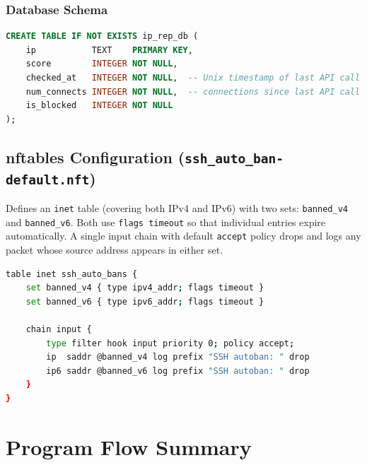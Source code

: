 \documentclass[11pt, letterpaper]{article}
\begin{document}
\subsubsection*{Database Schema}
\vspace{6pt}
\begin{lstlisting}[language=SQL]
CREATE TABLE IF NOT EXISTS ip_rep_db (
    ip           TEXT    PRIMARY KEY,
    score        INTEGER NOT NULL,
    checked_at   INTEGER NOT NULL,  -- Unix timestamp of last API call
    num_connects INTEGER NOT NULL,  -- connections since last API call
    is_blocked   INTEGER NOT NULL
);
\end{lstlisting}

\subsection{nftables Configuration (\texttt{ssh\_auto\_ban-default.nft})}

Defines an \texttt{inet} table (covering both IPv4 and IPv6) with two sets: \texttt{banned\_v4} and \texttt{banned\_v6}. Both use \texttt{flags timeout} so that individual entries expire automatically. A single input chain with default \texttt{accept} policy drops and logs any packet whose source address appears in either set.
\vspace{6pt}
\begin{lstlisting}[language=bash]
table inet ssh_auto_bans {
    set banned_v4 { type ipv4_addr; flags timeout }
    set banned_v6 { type ipv6_addr; flags timeout }

    chain input {
        type filter hook input priority 0; policy accept;
        ip  saddr @banned_v4 log prefix "SSH autoban: " drop
        ip6 saddr @banned_v6 log prefix "SSH autoban: " drop
    }
}
\end{lstlisting}

\newpage
\section{Program Flow Summary}
\end{document}
